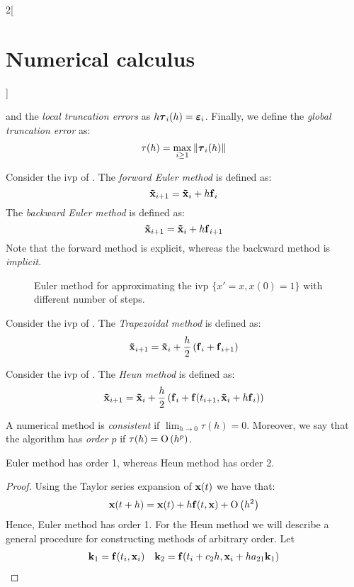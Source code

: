 \documentclass[../../../main_math.tex]{subfiles}
\begin{document}
\begin{multicols}{2}[\section{Numerical calculus}]
\begin{definition}
    and the \emph{local truncation errors} as $h\boldsymbol{\mathrm{\tau}}_{i}(h)=\boldsymbol{\mathrm{\varepsilon}}_i$. Finally, we define the \emph{global truncation error} as: $$\tau(h)=\max_{i\geq 1}\left\|\boldsymbol{\mathrm{\tau}}_i(h)\right\|$$
  \end{definition}
  \begin{definition}
    Consider the ivp of . The \emph{forward Euler method} is defined as:
    $$\boldsymbol{\mathrm{\tilde{x}}}_{i+1}=\boldsymbol{\mathrm{\tilde{x}}}_{i}+h\boldsymbol{\mathrm{f}}_i$$
    The \emph{backward Euler method} is defined as:
    $$\boldsymbol{\mathrm{\tilde{x}}}_{i+1}=\boldsymbol{\mathrm{\tilde{x}}}_{i}+h\boldsymbol{\mathrm{f}}_{i+1}$$
    Note that the forward method is explicit, whereas the backward method is \emph{implicit}.
  \end{definition}
  \begin{figure}[H]
    \centering
    
    \caption{Euler method for approximating the ivp $\{x'=x, x(0)=1\}$ with different number of steps.}
    \label{NC:euler_fig}
  \end{figure}
  \begin{definition}
    Consider the ivp of . The \emph{Trapezoidal method} is defined as:
    $$\boldsymbol{\mathrm{\tilde{x}}}_{i+1}=\boldsymbol{\mathrm{\tilde{x}}}_{i}+\frac{h}{2}\left(\boldsymbol{\mathrm{f}}_i+\boldsymbol{\mathrm{f}}_{i+1}\right)$$
  \end{definition}
  \begin{definition}
    Consider the ivp of . The \emph{Heun method} is defined as:
    $$\boldsymbol{\mathrm{\tilde{x}}}_{i+1}=\boldsymbol{\mathrm{\tilde{x}}}_{i}+\frac{h}{2}\left(\boldsymbol{\mathrm{f}}_i+\boldsymbol{\mathrm{f}}(t_{i+1},\boldsymbol{\mathrm{\tilde{x}}}_{i}+h\boldsymbol{\mathrm{f}}_i)\right)$$
  \end{definition}
  \begin{definition}
    A numerical method is \emph{consistent} if $\displaystyle\lim_{h\to 0}\tau(h)=0$. Moreover, we say that the algorithm has \emph{order} $p$ if $\tau(h)=\mathrm{O}\left(h^p\right)$.
  \end{definition}
  \begin{lemma}
    Euler method has order 1, whereas Heun method has order 2.
  \end{lemma}
  \begin{proof}
    Using the Taylor series expansion of $\boldsymbol{\mathrm{x}}(t)$ we have that:
    $$\boldsymbol{\mathrm{x}}(t+h) = \boldsymbol{\mathrm{x}}(t)+h\boldsymbol{\mathrm{f}}(t,\boldsymbol{\mathrm{x}}) + \mathrm{O}\left(h^2\right)$$
    Hence, Euler method has order 1. For the Heun method we will describe a general procedure for constructing methods of arbitrary order. Let
    \begin{gather*}
      \vf{k}_1=\vf{f}(t_i,\vf{x}_i)\quad \vf{k}_2=\vf{f}(t_i+c_2h,\vf{x}_i+ha_{21}\vf{k}_1)\\

\end{gather*}
\end{proof}
\end{multicols}
\end{document}
